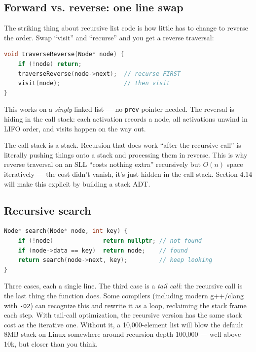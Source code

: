 \documentclass[11pt]{article}
\begin{document}
\subsection*{Forward vs. reverse: one line swap}

The striking thing about recursive list code is how little has to
change to reverse the order. Swap ``visit'' and ``recurse'' and
you get a reverse traversal:

\begin{examplebox}
\begin{lstlisting}[language=C++,basicstyle=\ttfamily\small,frame=single]
void traverseReverse(Node* node) {
    if (!node) return;
    traverseReverse(node->next);  // recurse FIRST
    visit(node);                  // then visit
}
\end{lstlisting}
\end{examplebox}

This works on a \emph{singly}-linked list --- no \texttt{prev}
pointer needed. The reversal is hiding in the call stack: each
activation records a node, all activations unwind in LIFO order,
and visits happen on the way out.

\begin{ideabox}
The call stack is a stack. Recursion that does work ``after the
recursive call'' is literally pushing things onto a stack and
processing them in reverse. This is why reverse traversal on an
SLL ``costs nothing extra'' recursively but $O(n)$ space
iteratively --- the cost didn't vanish, it's just hidden in the
call stack. Section 4.14 will make this explicit by building a
stack ADT.
\end{ideabox}

\subsection*{Recursive search}

\begin{examplebox}
\begin{lstlisting}[language=C++,basicstyle=\ttfamily\small,frame=single]
Node* search(Node* node, int key) {
    if (!node)              return nullptr; // not found
    if (node->data == key)  return node;    // found
    return search(node->next, key);         // keep looking
}
\end{lstlisting}
\end{examplebox}

Three cases, each a single line. The third case is a \emph{tail
call}: the recursive call is the last thing the function does.
Some compilers (including modern g++/clang with \texttt{-O2}) can
recognize this and rewrite it as a loop, reclaiming the stack
frame each step. With tail-call optimization, the recursive
version has the same stack cost as the iterative one. Without
it, a 10,000-element list will blow the default 8MB stack on
Linux somewhere around recursion depth 100,000 --- well above
10k, but closer than you think.
\end{document}
